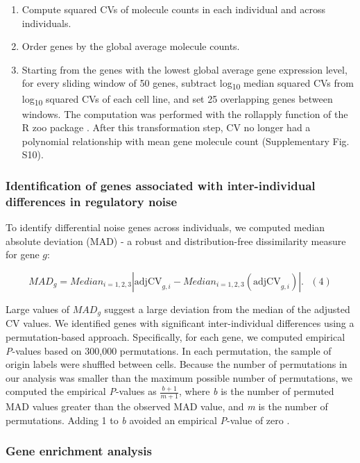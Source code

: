\begin{enumerate}
\def\labelenumi{\arabic{enumi}.}
\item
  Compute squared CVs of molecule counts in each individual and across
  individuals.
\item
  Order genes by the global average molecule counts.
\item
  Starting from the genes with the lowest global average gene expression
  level, for every sliding window of 50 genes, subtract
  log\textsubscript{10} median squared CVs from log\textsubscript{10}
  squared CVs of each cell line, and set 25 overlapping genes between
  windows. The computation was performed with the rollapply function of
  the R zoo package \citep{Zeileis2005}. After this transformation step,
  CV no longer had a polynomial relationship with mean gene molecule
  count (Supplementary Fig. S10).
\end{enumerate}

\subsubsection{Identification of genes associated with inter-individual
differences in regulatory
noise}\label{identification-of-genes-associated-with-inter-individual-differences-in-regulatory-noise}

To identify differential noise genes across individuals, we computed
median absolute deviation (MAD) - a robust and distribution-free
dissimilarity measure for gene $g$:

\[ MAD_{g} = Median_{i= 1,2,3} \left| \text{adjCV}_{g,i} -  Median_{i= 1,2,3} ({\text{adjCV}}_{g,i}) \right|. \,\,\,\,(4)\]

Large values of $MAD_{g}$ suggest a large deviation from the median of
the adjusted CV values. We identified genes with significant
inter-individual differences using a permutation-based approach.
Specifically, for each gene, we computed empirical \emph{P}-values based
on 300,000 permutations. In each permutation, the sample of origin
labels were shuffled between cells. Because the number of permutations
in our analysis was smaller than the maximum possible number of
permutations, we computed the empirical \emph{P}-values as
$\frac{b + 1}{m + 1}$, where \emph{b} is the number of permuted MAD
values greater than the observed MAD value, and \emph{m} is the number
of permutations. Adding 1 to \emph{b} avoided an empirical
\emph{P}-value of zero \citep{Phipson2010}.

\subsubsection{Gene enrichment analysis}\label{gene-enrichment-analysis}

